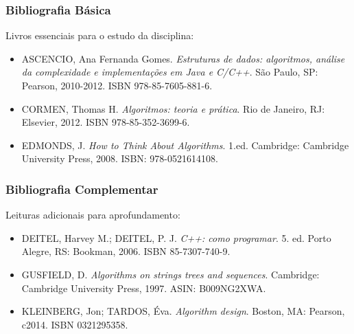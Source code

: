\begin{frame}
  \frametitle{Bibliografia Básica}
  Livros essenciais para o estudo da disciplina:
  \begin{itemize}
    \item ASCENCIO, Ana Fernanda Gomes. \emph{Estruturas de dados: algoritmos, análise da complexidade e implementações em Java e C/C++}. São Paulo, SP: Pearson, 2010-2012. ISBN 978-85-7605-881-6.
    \item CORMEN, Thomas H. \emph{Algoritmos: teoria e prática}. Rio de Janeiro, RJ: Elsevier, 2012. ISBN 978-85-352-3699-6.
    \item EDMONDS, J. \emph{How to Think About Algorithms}. 1.ed. Cambridge: Cambridge University Press, 2008. ISBN: 978-0521614108.
  \end{itemize}
\end{frame}
\begin{frame}
  \frametitle{Bibliografia Complementar}
  Leituras adicionais para aprofundamento:
  \begin{itemize}
    \item DEITEL, Harvey M.; DEITEL, P. J. \emph{C++: como programar}. 5. ed. Porto Alegre, RS: Bookman, 2006. ISBN 85-7307-740-9.
    \item GUSFIELD, D. \emph{Algorithms on strings trees and sequences}. Cambridge: Cambridge University Press, 1997. ASIN: B009NG2XWA.
    \item KLEINBERG, Jon; TARDOS, Éva. \emph{Algorithm design}. Boston, MA: Pearson, c2014. ISBN 0321295358.
  \end{itemize}
\end{frame}
